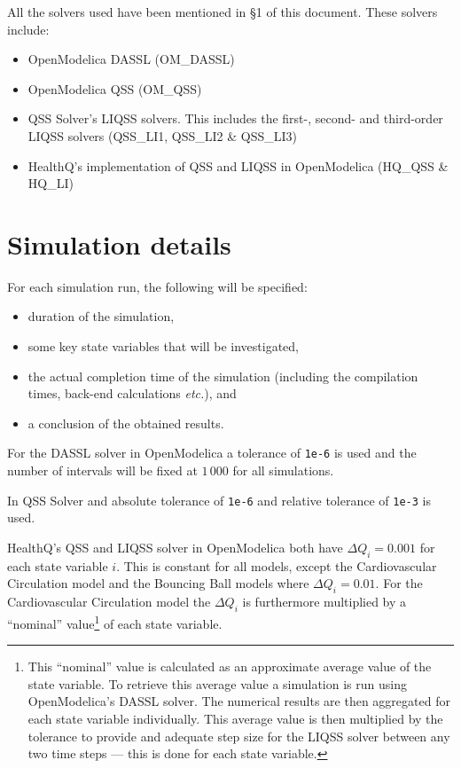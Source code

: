 \documentclass[10pt]{article}
\begin{document}
All the solvers used have been mentioned in \S1 of this document. These solvers include:
\begin{itemize}
 \item OpenModelica DASSL ({\sf OM\_DASSL})
 \item OpenModelica QSS ({\sf OM\_QSS})
 \item QSS Solver's LIQSS solvers. This includes the first-, second- and third-order LIQSS solvers ({\sf QSS\_LI1}, {\sf QSS\_LI2} \& {\sf QSS\_LI3})
 \item HealthQ's implementation of QSS and LIQSS in OpenModelica ({\sf HQ\_QSS} \& {\sf HQ\_LI})
\end{itemize}

\section{Simulation details}

For each simulation run, the following will be specified:
\begin{itemize}
 \item duration of the simulation,
 \item some key state variables that will be investigated,
 \item the actual completion time of the simulation (including the compilation times, back-end calculations {\em etc.}), and
 \item a conclusion of the obtained results.
\end{itemize}

For the DASSL solver in OpenModelica a tolerance of {\tt{1e-6}} is used and the number of intervals will be fixed at $1\,000$ for all simulations.

In QSS Solver and absolute tolerance of {\tt{1e-6}} and relative tolerance of {\tt{1e-3}} is used.

HealthQ's QSS and LIQSS solver in OpenModelica both  have $\Delta Q_i = 0.001$ for each state variable $i$. This is constant for all models, except the Cardiovascular Circulation model and the Bouncing Ball models where $\Delta Q_i=0.01$. For the Cardiovascular Circulation model the $\Delta Q_i$ is furthermore multiplied by a ``nominal'' value\footnote{This ``nominal'' value is calculated as an approximate average value of the state variable. To retrieve this average value a simulation is run using OpenModelica's DASSL solver. The numerical results are then aggregated for each state variable individually. This average value is then multiplied by the tolerance to provide and adequate step size for the LIQSS solver between any two time steps --- this is done for each state variable.} of each state variable.
\end{document}
